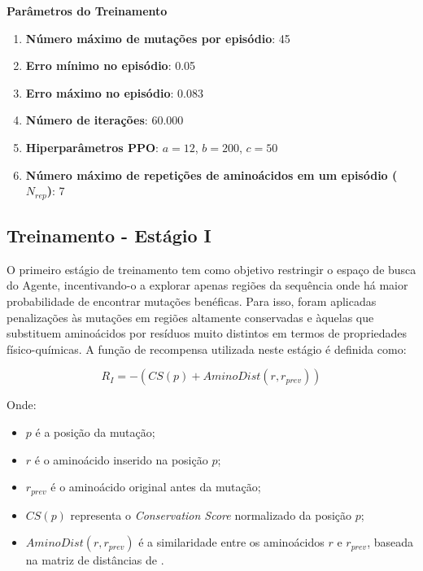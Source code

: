 \textbf{Parâmetros do Treinamento}
\begin{enumerate}
    \item \textbf{Número máximo de mutações por episódio}: 45
    \item \textbf{Erro mínimo no episódio}: 0.05
    \item \textbf{Erro máximo no episódio}: 0.083
    \item \textbf{Número de iterações}: 60.000
    \item \textbf{Hiperparâmetros PPO}: $a = 12$, $b = 200$, $c = 50$
    \item \textbf{Número máximo de repetições de aminoácidos em um episódio ($N_{rep}$)}: 7
\end{enumerate}









\subsection{Treinamento - Estágio I}
\label{subsection:stage1}

O primeiro estágio de treinamento tem como objetivo restringir o espaço de busca do Agente, 
incentivando-o a explorar apenas regiões da sequência onde há maior probabilidade de encontrar mutações benéficas.
Para isso, foram aplicadas penalizações às mutações em regiões altamente conservadas 
e àquelas que substituem aminoácidos por resíduos muito distintos em termos de propriedades físico-químicas.
 A função de recompensa utilizada neste estágio é definida como:

\begin{equation}
    R_{I} = -(CS(p) + AminoDist(r, r_{prev}))
\end{equation}

\noindent
Onde:
\begin{itemize}
    \item $p$ é a posição da mutação;
    \item $r$ é o aminoácido inserido na posição $p$;
    \item $r_{prev}$ é o aminoácido original antes da mutação;
    \item $CS(p)$ representa o \textit{Conservation Score} normalizado da posição $p$;
    \item $AminoDist(r, r_{prev})$ é a similaridade entre os aminoácidos $r$ e $r_{prev}$, baseada na matriz de distâncias de \cite{aminodist}.
\end{itemize}

